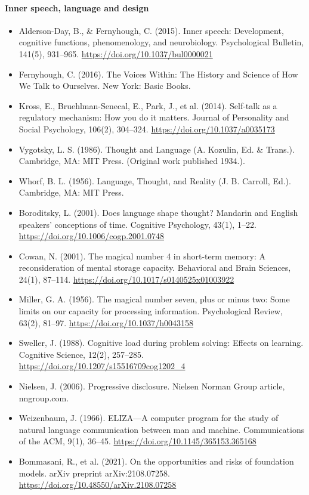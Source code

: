 \documentclass[10pt]{article}
\theoremstyle{remark}
\begin{document}
\paragraph{Inner speech, language and design}
\begin{itemize}[leftmargin=1em,itemsep=0pt,topsep=1pt,parsep=0pt]
\item Alderson-Day, B., \& Fernyhough, C. (2015). Inner speech: Development, cognitive functions, phenomenology, and neurobiology. Psychological Bulletin, 141(5), 931--965. \url{https://doi.org/10.1037/bul0000021}
\item Fernyhough, C. (2016). The Voices Within: The History and Science of How We Talk to Ourselves. New York: Basic Books.
\item Kross, E., Bruehlman-Senecal, E., Park, J., et al. (2014). Self-talk as a regulatory mechanism: How you do it matters. Journal of Personality and Social Psychology, 106(2), 304--324. \url{https://doi.org/10.1037/a0035173}
\item Vygotsky, L. S. (1986). Thought and Language (A. Kozulin, Ed. \& Trans.). Cambridge, MA: MIT Press. (Original work published 1934.).
\item Whorf, B. L. (1956). Language, Thought, and Reality (J. B. Carroll, Ed.). Cambridge, MA: MIT Press.
\item Boroditsky, L. (2001). Does language shape thought? Mandarin and English speakers' conceptions of time. Cognitive Psychology, 43(1), 1--22. \url{https://doi.org/10.1006/cogp.2001.0748}
\item Cowan, N. (2001). The magical number 4 in short-term memory: A reconsideration of mental storage capacity. Behavioral and Brain Sciences, 24(1), 87--114. \url{https://doi.org/10.1017/s0140525x01003922}
\item Miller, G. A. (1956). The magical number seven, plus or minus two: Some limits on our capacity for processing information. Psychological Review, 63(2), 81--97. \url{https://doi.org/10.1037/h0043158}
\item Sweller, J. (1988). Cognitive load during problem solving: Effects on learning. Cognitive Science, 12(2), 257--285. \url{https://doi.org/10.1207/s15516709cog1202_4}
\item Nielsen, J. (2006). Progressive disclosure. Nielsen Norman Group article, nngroup.com.
\item Weizenbaum, J. (1966). ELIZA---A computer program for the study of natural language communication between man and machine. Communications of the ACM, 9(1), 36--45. \url{https://doi.org/10.1145/365153.365168}
\item Bommasani, R., et al. (2021). On the opportunities and risks of foundation models. arXiv preprint arXiv:2108.07258. \url{https://doi.org/10.48550/arXiv.2108.07258}
\end{itemize}
\end{document}
